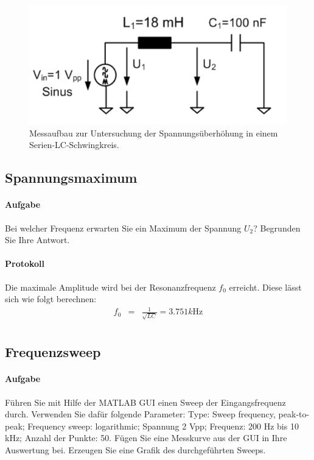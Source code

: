 \documentclass[10pt]{scrreprt}
\begin{document}
        \begin{center}
            \begin{figure}[H]
                \includegraphics[width=\textwidth]{Abbildung18.png}
                \caption{Messaufbau zur Untersuchung der Spannungsüberhöhung in einem
                    Serien-LC-Schwingkreis.}
                \label{fig:abb18}
            \end{figure}
        \end{center}

        \subsection{Spannungsmaximum}
        \paragraph{Aufgabe}
        Bei welcher Frequenz erwarten Sie ein Maximum der Spannung $U_2$? Begrunden Sie
        Ihre Antwort.

        \paragraph{Protokoll}
        Die maximale Amplitude wird bei der Resonanzfrequenz $f_0$ erreicht. Diese lässt
        sich wie folgt berechnen:
        \begin{eqnarray}
            f_0 &=& \frac{1}{\sqrt{LC}} = 3.751\si{k\hertz}\\
        \end{eqnarray}

        \subsection{Frequenzsweep}
        \paragraph{Aufgabe}
        Führen Sie mit Hilfe der MATLAB GUI einen Sweep der Eingangsfrequenz durch.
        Verwenden Sie dafür folgende Parameter: Type: Sweep frequency, peak-to-peak;
        Frequency sweep: logarithmic; Spannung 2 Vpp; Frequenz: 200 Hz bis 10 kHz; Anzahl
        der Punkte: 50. Fügen Sie eine Messkurve aus der GUI in Ihre Auswertung bei.
        Erzeugen Sie eine Grafik des durchgeführten Sweeps.
\end{document}
